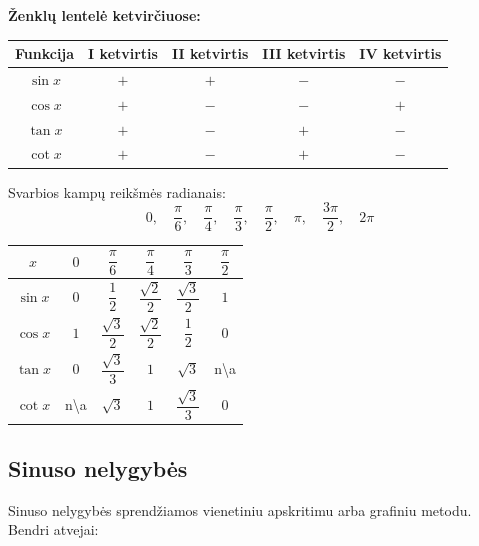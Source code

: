 \textbf{Ženklų lentelė ketvirčiuose:}

\begin{center}
\begin{tabular}{|c|c|c|c|c|}
\hline
\textbf{Funkcija} & \textbf{I ketvirtis} & \textbf{II ketvirtis} & \textbf{III ketvirtis} & \textbf{IV ketvirtis} \\
\hline
$\sin x$ & $+$ & $+$ & $-$ & $-$ \\
$\cos x$ & $+$ & $-$ & $-$ & $+$ \\
$\tan x$ & $+$ & $-$ & $+$ & $-$ \\
$\cot x$ & $+$ & $-$ & $+$ & $-$ \\
\hline
\end{tabular}
\end{center}

Svarbios kampų reikšmės radianais:
\[
0,\quad \frac{\pi}{6},\quad \frac{\pi}{4},\quad \frac{\pi}{3},\quad \frac{\pi}{2},\quad \pi,\quad \frac{3\pi}{2},\quad 2\pi
\]

\begin{tcolorbox}[colback=yellow!10!white, colframe=orange!80!black, title=Pagrindinių kampų reikšmių lentelė]
\begin{center}
\renewcommand{\arraystretch}{1.5}
\begin{tabular}{|c|c|c|c|c|c|}
\hline
$x$ & $0$ & $\dfrac{\pi}{6}$ & $\dfrac{\pi}{4}$ & $\dfrac{\pi}{3}$ & $\dfrac{\pi}{2}$ \\
\hline
$\sin x$ & $0$ & $\dfrac{1}{2}$ & $\dfrac{\sqrt{2}}{2}$ & $\dfrac{\sqrt{3}}{2}$ & $1$ \\
\hline
$\cos x$ & $1$ & $\dfrac{\sqrt{3}}{2}$ & $\dfrac{\sqrt{2}}{2}$ & $\dfrac{1}{2}$ & $0$ \\
\hline
$\tan x$ & $0$ & $\dfrac{\sqrt{3}}{3}$ & $1$ & $\sqrt{3}$ & n\textbackslash a \\
\hline
$\cot x$ & n\textbackslash a & $\sqrt{3}$ & $1$ & $\dfrac{\sqrt{3}}{3}$ & $0$ \\
\hline
\end{tabular}
\end{center}
\end{tcolorbox}

\subsection{Sinuso nelygybės}

Sinuso nelygybės sprendžiamos vienetiniu apskritimu arba grafiniu metodu. Bendri atvejai:

